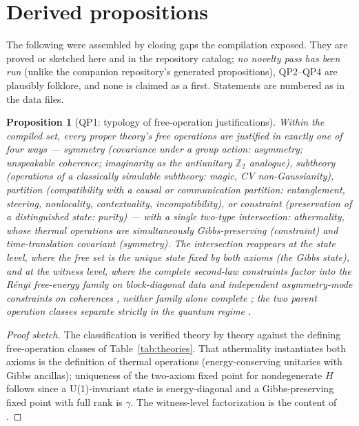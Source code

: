 \documentclass[11pt,a4paper]{article}
\newtheorem{proposition}{Proposition}
\theoremstyle{definition}
\begin{document}
\section{Derived propositions}\label{sec:derived}

The following were assembled by closing gaps the compilation exposed. They
are proved or sketched here and in the repository catalog; \emph{no novelty
pass has been run} (unlike the companion repository's generated
propositions), QP2--QP4 are plausibly folklore, and none is claimed as a
first. Statements are numbered as in the data files.

\begin{proposition}[QP1: typology of free-operation justifications]
\label{prop:qp1}
Within the compiled set, every proper theory's free operations are justified
in exactly one of four ways --- symmetry (covariance under a group action:
asymmetry; unspeakable coherence; imaginarity as the antiunitary
$\mathbb{Z}_2$ analogue), subtheory (operations of a classically simulable
subtheory: magic, CV non-Gaussianity), partition (compatibility with a causal
or communication partition: entanglement, steering, nonlocality,
contextuality, incompatibility), or constraint (preservation of a
distinguished state: purity) --- with a single two-type intersection:
athermality, whose thermal operations are simultaneously Gibbs-preserving
(constraint) and time-translation covariant (symmetry). The intersection
reappears at the state level, where the free set is the unique state fixed by
both axioms (the Gibbs state), and at the witness level, where the complete
second-law constraints factor into the R\'enyi free-energy family on
block-diagonal data \cite{brandao2015pnas} and independent asymmetry-mode
constraints on coherences \cite{lostaglio2015prx}, neither family alone
complete \cite{lostaglio2015natcomm}; the two parent operation classes
separate strictly in the quantum regime \cite{faist2015}.
\end{proposition}

\begin{proof}[Proof sketch]
The classification is verified theory by theory against the defining
free-operation classes of Table~\ref{tab:theories}. That athermality
instantiates both axioms is the definition of thermal operations
(energy-conserving unitaries with Gibbs ancillas); uniqueness of the
two-axiom fixed point for nondegenerate $H$ follows since a U(1)-invariant
state is energy-diagonal and a Gibbs-preserving fixed point with full rank is
$\gamma$. The witness-level factorization is the content of
\cite{brandao2015pnas,lostaglio2015prx,lostaglio2015natcomm}.
\end{proof}
\end{document}
